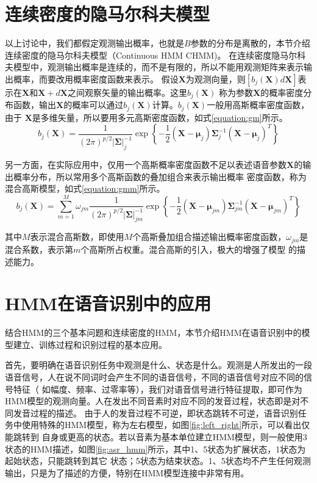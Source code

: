 \section{连续密度的隐马尔科夫模型}

    以上讨论中，我们都假定观测输出概率，也就是$B$参数的分布是离散的，本节介绍连续密度的隐马尔科夫模型（Continuous HMM CHMM)。
    在连续密度隐马尔科夫模型中，观测输出概率是连续的，而不是有限的，所以不能用观测矩阵来表示输出概率，而要改用概率密度函数来表示。
    假设$\bm{X}$为观测向量，则$[b_{j}(\bm{X})d\bm{X}]$表示在$\bm{X}$和$\bm{X}+d\bm{X}$之间观察矢量的输出概率。这里$b_{j}(\bm{X})$
    称为参数$\bm{X}$的概率密度分布函数，输出$\bm{X}$的概率可以通过$b_{j}(\bm{X})$计算。$b_{j}(\bm{X})$一般用高斯概率密度函数，由于
    $\bm{X}$是多维矢量，所以要用多元高斯密度函数，如式\ref{equation:gm}所示。
    \begin{equation}\label{equation:gm}
       {b_j}(\bm{X}) = \frac{1}{{{{(2\pi )}^{p/2}}{|{\bm{\Sigma}} |_j^{ - 1}}}}\exp \left\{ { - \frac{1}{2}(\bm{X} - {{\bm{\mu}} _j}) {\bm{\Sigma}}_j^{ - 1}{{(\bm{X} - {{\bm{\mu}}_j})}^T}} \right\}
    \end{equation}

    另一方面，在实际应用中，仅用一个高斯概率密度函数不足以表述语音参数$\bm{X}$的输出概率分布，所以常用多个高斯函数的叠加组合来表示输出概率
    密度函数，称为混合高斯模型，如式\ref{equation:gmm}所示。
    \begin{equation}\label{equation:gmm}
       {b_j}(\bm{X}) = \sum\limits_{m = 1}^M {{\omega _{jm}}} \frac{1}{{{{(2\pi )}^{p/2}}|{\bm{\Sigma}} |_{jm}^{ - 1}}}\exp \left\{ { - \frac{1}{2}(\bm{X} - {{\bm{\mu}} _{jm}}){\bm{\Sigma}}_{jm}^{ - 1}{{(\bm{X} - {{\bm{\mu}} _{jm}})}^T}} \right\}
    \end{equation}

    其中$M$表示混合高斯数，即使用$M$个高斯叠加组合描述输出概率密度函数，${\omega_{jm}}$是混合系数，表示第$m$个高斯所占权重。混合高斯的引入，极大的增强了模型
    的描述能力。


\section{HMM在语音识别中的应用}
    结合HMM的三个基本问题和连续密度的HMM，本节介绍HMM在语音识别中的模型建立、训练过程和识别过程的基本应用。

    首先，要明确在语音识别任务中观测是什么、状态是什么。观测是人所发出的一段语音信号，人在说不同词时会产生不同的语音信号，不同的语音信号对应不同的信号特征（
    如幅度、频率、过零率等），我们对语音信号进行特征提取，即可作为HMM模型的观测向量。人在发出不同音素时对应不同的发音过程，状态即是对不同发音过程的描述。
    由于人的发音过程不可逆，即状态跳转不可逆，语音识别任务中使用特殊的HMM模型，称为左右模型，如图\ref{fig:left_right}所示，可以看出仅能跳转到
    自身或更高的状态。若以音素为基本单位建立HMM模型，则一般使用3状态的HMM描述，如图\ref{fig:asr_hmm}所示，其中1、5状态为扩展状态，1状态为起始状态，只能跳转到其它
    状态；5状态为结束状态。1、5状态均不产生任何观测输出，只是为了描述的方便，特别在HMM模型连接中非常有用。

